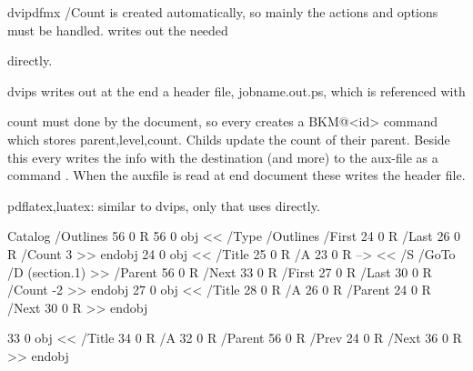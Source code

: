 dvipdfmx /Count is created automatically, so mainly the actions and options must be handled.
\bookmarks writes out the needed \special directly. 


dvips writes out at the end a header file, jobname.out.ps, which is referenced with %
  count must done by the document, so every \bookmark creates a BKM@<id> command which stores {parent,level,count}.
  Childs update the count of their parent. Beside this every \bookmark writes the info with the destination (and more) to the aux-file as
  a command \BKM@entry. When the auxfile is read at end document these \BKM@entry writes the header file.
  
pdflatex,luatex: similar to dvips, only that \BKM@entry uses \pdfoutline directly.    


Catalog 
   /Outlines 56 0 R
             56 0 obj
             <<
            /Type /Outlines
            /First 24 0 R
            /Last 26 0 R
            /Count 3
            >>
            endobj
               24 0 obj
               <<
               /Title 25 0 R
               /A 23 0 R      --> << /S /GoTo /D (section.1) >>
               /Parent 56 0 R
               /Next 33 0 R
               /First 27 0 R
               /Last 30 0 R
               /Count -2
               >>
               endobj
                  27 0 obj
                 <<
                 /Title 28 0 R
                 /A 26 0 R
                 /Parent 24 0 R
                 /Next 30 0 R
                 >>
                 endobj
               
               33 0 obj
               <<
               /Title 34 0 R
               /A 32 0 R
               /Parent 56 0 R
               /Prev 24 0 R
               /Next 36 0 R
               >>
               endobj
               
